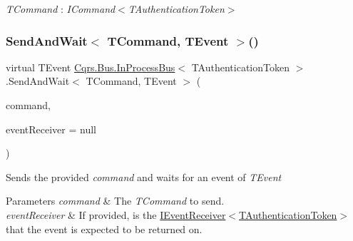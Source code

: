 \begin{Desc}
\item[Type Constraints]\begin{description}
\item[{\em T\+Command} : {\em I\+Command$<$T\+Authentication\+Token$>$}]\end{description}
\end{Desc}
\mbox{\label{classCqrs_1_1Bus_1_1InProcessBus_a506d617dc7ec3838791a91e09b73b8ce_a506d617dc7ec3838791a91e09b73b8ce}} 
\subsubsection{\texorpdfstring{Send\+And\+Wait$<$ T\+Command, T\+Event $>$()}{SendAndWait< TCommand, TEvent >()}\hspace{0.1cm}{\footnotesize\ttfamily [1/6]}}
{\footnotesize\ttfamily virtual T\+Event \hyperlink{classCqrs_1_1Bus_1_1InProcessBus}{Cqrs.\+Bus.\+In\+Process\+Bus}$<$ T\+Authentication\+Token $>$.Send\+And\+Wait$<$ T\+Command, T\+Event $>$ (\begin{DoxyParamCaption}\item[{T\+Command}]{command,  }\item[{\hyperlink{interfaceCqrs_1_1Events_1_1IEventReceiver}{I\+Event\+Receiver}$<$ T\+Authentication\+Token $>$}]{event\+Receiver = {\ttfamily null} }\end{DoxyParamCaption})\hspace{0.3cm}{\ttfamily [virtual]}}



Sends the provided {\itshape command}  and waits for an event of {\itshape T\+Event}  


\begin{DoxyParams}{Parameters}
{\em command} & The {\itshape T\+Command}  to send.\\
\hline
{\em event\+Receiver} & If provided, is the \hyperlink{interfaceCqrs_1_1Events_1_1IEventReceiver}{I\+Event\+Receiver$<$\+T\+Authentication\+Token$>$} that the event is expected to be returned on.\\
\hline
\end{DoxyParams}


